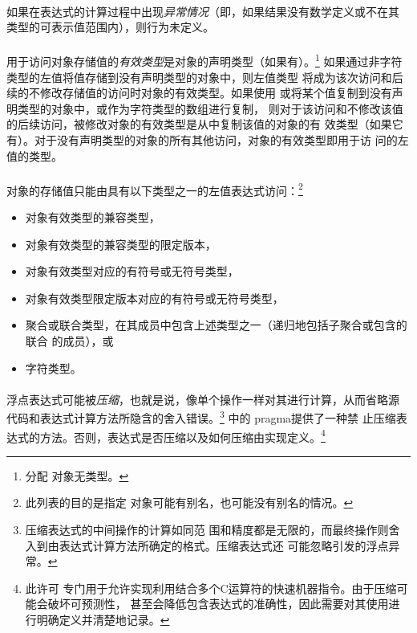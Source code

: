 {\paragraph{}
如果在表达式的计算过程中出现\textit{异常情况}（即，如果结果没有数学定义或不在其
类型的可表示值范围内），则行为未定义。

\paragraph{}
用于访问对象存储值的\textit{有效类型}是对象的声明类型（如果有）。\footnote{分配
对象无类型。} 如果通过非字符类型的左值将值存储到没有声明类型的对象中，则左值类型
将成为该次访问和后续的不修改存储值的访问时对象的有效类型。如果使用
或将某个值复制到没有声明类型的对象中，或作为字符类型的数组进行复制，
则对于该访问和不修改该值的后续访问，被修改对象的有效类型是从中复制该值的对象的有
效类型（如果它有）。对于没有声明类型的对象的所有其他访问，对象的有效类型即用于访
问的左值的类型。

\paragraph{}
对象的存储值只能由具有以下类型之一的左值表达式访问：\footnote{此列表的目的是指定
对象可能有别名，也可能没有别名的情况。}
\begin{itemize}
  \item{对象有效类型的兼容类型，}
  \item{对象有效类型的兼容类型的限定版本，}
  \item{对象有效类型对应的有符号或无符号类型，}
  \item{对象有效类型限定版本对应的有符号或无符号类型，}
  \item{聚合或联合类型，在其成员中包含上述类型之一（递归地包括子聚合或包含的联合
    的成员），或}
  \item{字符类型。}
\end{itemize}

\paragraph{}
浮点表达式可能被\textit{压缩}，也就是说，像单个操作一样对其进行计算，从而省略源
代码和表达式计算方法所隐含的舍入错误。\footnote{压缩表达式的中间操作的计算如同范
围和精度都是无限的，而最终操作则舍入到由表达式计算方法所确定的格式。压缩表达式还
可能忽略引发的浮点异常。} 中的 pragma提供了一种禁
止压缩表达式的方法。否则，表达式是否压缩以及如何压缩由实现定义。\footnote{此许可
专门用于允许实现利用结合多个C运算符的快速机器指令。由于压缩可能会破坏可预测性，
甚至会降低包含表达式的准确性，因此需要对其使用进行明确定义并清楚地记录。}

}

